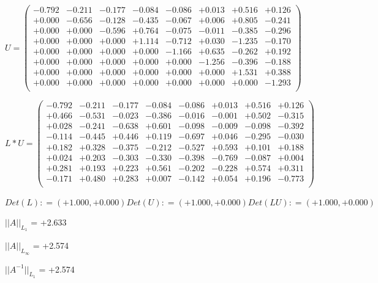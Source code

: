 \documentclass[9pt]{article}
\theoremstyle{plain}
\theoremstyle{definition}
\theoremstyle{remark}
\numberwithin{equation}{section}
\begin{document}
$U = \left(
\begin{array}{
cccccccc}
-0.792 & -0.211 & -0.177 & -0.084 & -0.086 & +0.013 & +0.516 & +0.126 \\
+0.000 & -0.656 & -0.128 & -0.435 & -0.067 & +0.006 & +0.805 & -0.241 \\
+0.000 & +0.000 & -0.596 & +0.764 & -0.075 & -0.011 & -0.385 & -0.296 \\
+0.000 & +0.000 & +0.000 & +1.114 & -0.712 & +0.030 & -1.235 & -0.170 \\
+0.000 & +0.000 & +0.000 & +0.000 & -1.166 & +0.635 & -0.262 & +0.192 \\
+0.000 & +0.000 & +0.000 & +0.000 & +0.000 & -1.256 & -0.396 & -0.188 \\
+0.000 & +0.000 & +0.000 & +0.000 & +0.000 & +0.000 & +1.531 & +0.388 \\
+0.000 & +0.000 & +0.000 & +0.000 & +0.000 & +0.000 & +0.000 & -1.293 \\
\end{array}
\right)$ \newline 

$L * U  = \left(
\begin{array}{
cccccccc}
-0.792 & -0.211 & -0.177 & -0.084 & -0.086 & +0.013 & +0.516 & +0.126 \\
+0.466 & -0.531 & -0.023 & -0.386 & -0.016 & -0.001 & +0.502 & -0.315 \\
+0.028 & -0.241 & -0.638 & +0.601 & -0.098 & -0.009 & -0.098 & -0.392 \\
-0.114 & -0.445 & +0.446 & +0.119 & -0.697 & +0.046 & -0.295 & -0.030 \\
+0.182 & +0.328 & -0.375 & -0.212 & -0.527 & +0.593 & +0.101 & +0.188 \\
+0.024 & +0.203 & -0.303 & -0.330 & -0.398 & -0.769 & -0.087 & +0.004 \\
+0.281 & +0.193 & +0.223 & +0.561 & -0.202 & -0.228 & +0.574 & +0.311 \\
-0.171 & +0.480 & +0.283 & +0.007 & -0.142 & +0.054 & +0.196 & -0.773 \\
\end{array}
\right)$ \newline 

$Det(L) :    = (+1.000,+0.000)     Det(U) :    = (+1.000,+0.000)     Det(LU) :    = (+1.000,+0.000)$

$||A||_{L_1}$  = +2.633

$||A||_{L_{\infty}}$ = +2.574

$||A^{-1}||_{L_1}$  = +2.574
\end{document}
